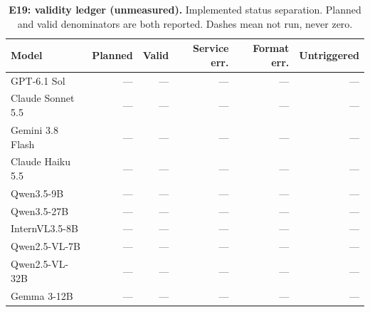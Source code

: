 \begin{table}[!ht]
\centering\small
\caption{\textbf{E19: validity ledger (unmeasured).} Implemented status separation. Planned and valid denominators are both reported. Dashes mean not run, never zero.}
\begin{tabularx}{\textwidth}{@{}Xrrrrr@{}}\toprule
Model & Planned & Valid & Service err. & Format err. & Untriggered\\\midrule
GPT-6.1 Sol & --- & --- & --- & --- & ---\\
Claude Sonnet 5.5 & --- & --- & --- & --- & ---\\
Gemini 3.8 Flash & --- & --- & --- & --- & ---\\
Claude Haiku 5.5 & --- & --- & --- & --- & ---\\
Qwen3.5-9B & --- & --- & --- & --- & ---\\
Qwen3.5-27B & --- & --- & --- & --- & ---\\
InternVL3.5-8B & --- & --- & --- & --- & ---\\
Qwen2.5-VL-7B & --- & --- & --- & --- & ---\\
Qwen2.5-VL-32B & --- & --- & --- & --- & ---\\
Gemma 3-12B & --- & --- & --- & --- & ---\\
\bottomrule
\end{tabularx}
\end{table}
